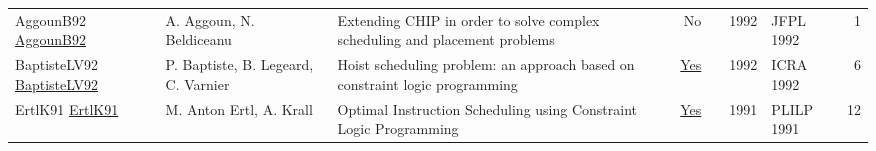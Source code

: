 {\begin{longtable}{p{3cm}p{6cm}p{7cm}rrrp{3cm}r}
AggounB92 \href{}{AggounB92} & A. Aggoun, N. Beldiceanu & Extending {CHIP} in order to solve complex scheduling and placement problems & No & \cite{AggounB92} & 1992 & JFPL 1992 & 1\\
BaptisteLV92 \href{https://doi.org/10.1109/ROBOT.1992.220195}{BaptisteLV92} & P. Baptiste, B. Legeard, C. Varnier & Hoist scheduling problem: an approach based on constraint logic programming & \href{papers/BaptisteLV92.pdf}{Yes} & \cite{BaptisteLV92} & 1992 & ICRA 1992 & 6\\
ErtlK91 \href{https://doi.org/10.1007/3-540-54444-5\_89}{ErtlK91} & M. Anton Ertl, A. Krall & Optimal Instruction Scheduling using Constraint Logic Programming & \href{papers/ErtlK91.pdf}{Yes} & \cite{ErtlK91} & 1991 & PLILP 1991 & 12\\
\end{longtable}
}


